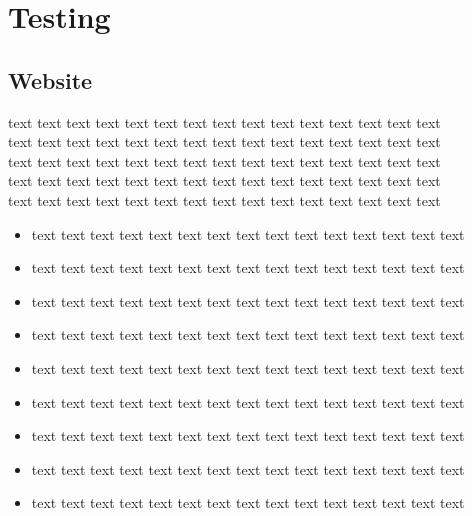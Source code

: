 \documentclass[12pt]{report}
\begin{document}
\section*{Testing}
\subsection*{Website}
text text text text text text text text text text text text text text text\\text text text text text text text text text text text text text text text\\text text text text text text text text text text text text text text text\\text text text text text text text text text text text text text text text\\text text text text text text text text text text text text text text text\\
\begin{itemize}
\item text text text text text text text text text text text text text text text\\
\item text text text text text text text text text text text text text text text\\
\item text text text text text text text text text text text text text text text\\
\item text text text text text text text text text text text text text text text\\
\item text text text text text text text text text text text text text text text\\
\item text text text text text text text text text text text text text text text\\
\item text text text text text text text text text text text text text text text\\
\item text text text text text text text text text text text text text text text\\
\item text text text text text text text text text text text text text text text\\
\end{itemize}
\end{document}

